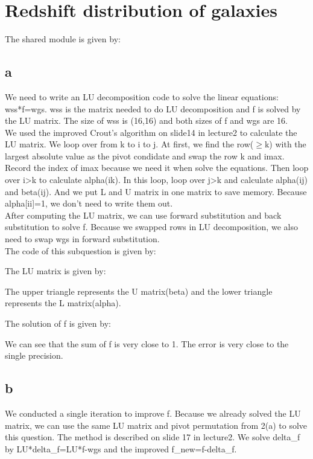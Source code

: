 \section{Redshift distribution of galaxies}

The shared module is given by:



\subsection{a}
We need to write an LU decomposition code to solve the linear equations: wss*f=wgs.
wss is the matrix needed to do LU decomposition and f is solved by the LU matrix.
The size of wss is (16,16) and both sizes of f and wgs are 16.\\
We used the improved Crout's algorithm on slide14 in lecture2 to calculate the LU matrix.
We loop over from k to i to j. At first, we find the row($\geq $k) with the largest absolute value as the pivot condidate and swap the row k and imax.
Record the index of imax because we need it when solve the equations. Then loop over i\textgreater k to calculate alpha(ik).
In this loop, loop over j\textgreater k and calculate alpha(ij) and beta(ij). And we put L and U matrix in one matrix to save memory.
Because alpha[ii]=1, we don't need to write them out.\\

After computing the LU matrix, we can use forward substitution and back substitution to solve f. Because we swapped rows in LU decomposition,
we also need to swap wgs in forward substitution.\\

The code of this subquestion is given by:



The LU matrix is given by:


The upper triangle represents the U matrix(beta) and the lower triangle represents the L matrix(alpha).

The solution of f is given by:


We can see that the sum of f is very close to 1. The error is very close to the single precision.

\subsection{b}
We conducted a single iteration to improve f. Because we already solved the LU matrix,
we can use the same LU matrix and pivot permutation from 2(a) to solve this question. The method is described on slide 17 in lecture2.
We solve delta\_f by LU*delta\_f=LU*f-wgs and the improved f\_new=f-delta\_f.\\

